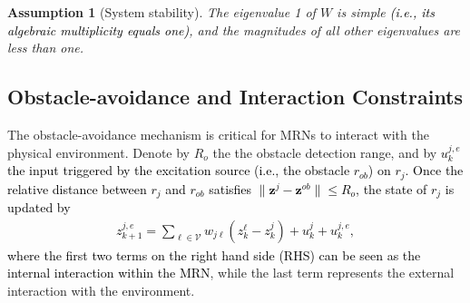 \documentclass[12pt,journal,draftclsnofoot,onecolumn]{IEEEtran}
\newtheorem{assumption}{Assumption}
\begin{document}
\begin{assumption}[System stability]\label{assum:stability}
The eigenvalue 1 of $W$ is simple \textcolor{black}{(i.e., its algebraic multiplicity equals one)}, and the magnitudes of all other eigenvalues are less than one. 
\end{assumption}




\subsection{Obstacle-avoidance and Interaction Constraints}
The obstacle-avoidance mechanism is critical for MRNs to interact with the physical environment. 
Denote by $R_o$ the the obstacle detection range, and by \textcolor{black}{$u_{k}^{j,e}$ the input triggered by the excitation source (i.e., the obstacle $r_{ob}$) on $r_j$. 
Once the relative distance between $r_j$ and $r_{ob}$ satisfies $\|\mathbf{z}^j-\mathbf{z}^{ob}\|\le R_o$, the state of $r_j$ is updated by 
\begin{align}\label{eq:obstacle-rule}
z_{k+1}^{j,e}=\sum\limits_{\ell \in \mathcal{V}} {{w_{j\ell}}(z_k^{\ell}-z_k^j)} + u_k^{j} + u_{k}^{j,e},
\end{align}
where the first two terms on the right hand side (RHS) can be seen as the internal interaction within the MRN}, while the last term represents the external interaction with the environment. 
\end{document}
